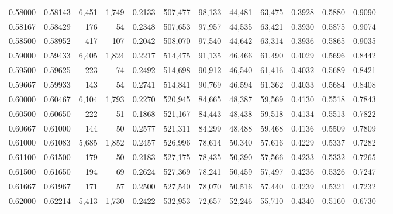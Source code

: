 \begin{tabular}{rrrrrrrrrrrrr}
0.58000 & 0.58143 &  6,451 & 1,749 &                                     0.2133 & 507,477 &  98,133 &  44,481 &  63,475 & 0.3928 & 0.5880 & 0.9090 \\
0.58167 & 0.58429 &    176 &    54 &                                     0.2348 & 507,653 &  97,957 &  44,535 &  63,421 & 0.3930 & 0.5875 & 0.9074 \\
0.58500 & 0.58952 &    417 &   107 &                                     0.2042 & 508,070 &  97,540 &  44,642 &  63,314 & 0.3936 & 0.5865 & 0.9035 \\
0.59000 & 0.59433 &  6,405 & 1,824 &                                     0.2217 & 514,475 &  91,135 &  46,466 &  61,490 & 0.4029 & 0.5696 & 0.8442 \\
0.59500 & 0.59625 &    223 &    74 &                                     0.2492 & 514,698 &  90,912 &  46,540 &  61,416 & 0.4032 & 0.5689 & 0.8421 \\
0.59667 & 0.59933 &    143 &    54 &                                     0.2741 & 514,841 &  90,769 &  46,594 &  61,362 & 0.4033 & 0.5684 & 0.8408 \\
0.60000 & 0.60467 &  6,104 & 1,793 &                                     0.2270 & 520,945 &  84,665 &  48,387 &  59,569 & 0.4130 & 0.5518 & 0.7843 \\
0.60500 & 0.60650 &    222 &    51 &                                     0.1868 & 521,167 &  84,443 &  48,438 &  59,518 & 0.4134 & 0.5513 & 0.7822 \\
0.60667 & 0.61000 &    144 &    50 &                                     0.2577 & 521,311 &  84,299 &  48,488 &  59,468 & 0.4136 & 0.5509 & 0.7809 \\
0.61000 & 0.61083 &  5,685 & 1,852 &                                     0.2457 & 526,996 &  78,614 &  50,340 &  57,616 & 0.4229 & 0.5337 & 0.7282 \\
0.61100 & 0.61500 &    179 &    50 &                                     0.2183 & 527,175 &  78,435 &  50,390 &  57,566 & 0.4233 & 0.5332 & 0.7265 \\
0.61500 & 0.61650 &    194 &    69 &                                     0.2624 & 527,369 &  78,241 &  50,459 &  57,497 & 0.4236 & 0.5326 & 0.7247 \\
0.61667 & 0.61967 &    171 &    57 &                                     0.2500 & 527,540 &  78,070 &  50,516 &  57,440 & 0.4239 & 0.5321 & 0.7232 \\
0.62000 & 0.62214 &  5,413 & 1,730 &                                     0.2422 & 532,953 &  72,657 &  52,246 &  55,710 & 0.4340 & 0.5160 & 0.6730 \\

\end{tabular}
